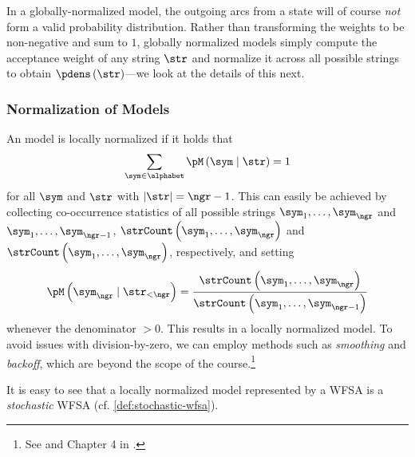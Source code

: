 In a globally-normalized model, the outgoing arcs from a state will of course \emph{not} form a valid probability distribution.
Rather than transforming the weights to be non-negative and sum to $1$, globally normalized models simply compute the acceptance weight of any string $\str$ and normalize it across all possible strings to obtain $\pdens\left(\str\right)$---we look at the details of this next.

\subsubsection{Normalization of \ngram{} Models} \label{sec:n-gram-normalization}
An \ngram{} model is locally normalized if it holds that 
\begin{equation}
    \sum_{\sym \in \alphabet} \pM\left(\sym \mid \str\right) = 1
\end{equation}
for all $\sym$ and $\str$ with $|\str| = \ngr - 1$.
This can easily be achieved by collecting co-occurrence statistics of all possible strings $\sym_1,\ldots,\sym_\ngr$ and $\sym_1,\ldots,\sym_{\ngr-1}$, $\strCount\left(\sym_1,\ldots,\sym_\ngr\right)$ and $\strCount\left(\sym_1,\ldots,\sym_\ngr\right)$, respectively, and setting 
\begin{equation}
    \pM\left(\sym_\ngr\mid \str_{<\ngr}\right) = \frac{\strCount\left(\sym_1,\ldots,\sym_\ngr\right)}{\strCount\left(\sym_1,\ldots,\sym_{\ngr-1}\right)}
\end{equation}
whenever the denominator $>0$.
This results in a locally normalized \ngram{} model.
To avoid issues with division-by-zero, we can employ methods such as \emph{smoothing} and \emph{backoff}, which are beyond the scope of the course.\footnote{See \citep{chen-goodman-1996-empirical} and Chapter 4 in \citep{jurafsky_martin_2009}.}

It is easy to see that a locally normalized \ngram{} model represented by a WFSA is a \emph{stochastic} WFSA (cf. \cref{def:stochastic-wfsa}).

